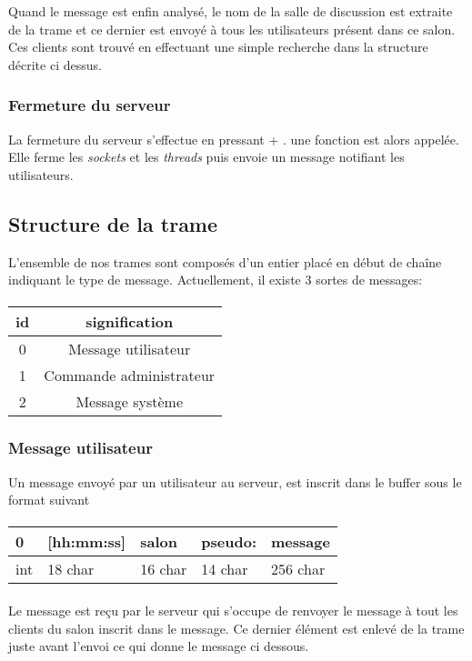 \documentclass[a4paper, 12pt]{article}
\newcommand{\Touche}[1]{\Ovalbox{#1}}
\begin{document}
Quand le message est enfin analysé, le nom de la salle de discussion est extraite de la trame et ce dernier est envoyé à tous les utilisateurs présent dans ce salon. Ces clients sont trouvé en effectuant une simple recherche dans la structure décrite ci dessus.

\subsubsection{Fermeture du serveur}
La fermeture du serveur s'effectue en pressant \Touche{Ctrl} + \Touche{C}. une fonction est alors appelée. Elle ferme les \emph{sockets} et les \emph{threads} puis envoie un message notifiant les utilisateurs.

\subsection{Structure de la trame}
L'ensemble de nos trames sont composés d'un entier placé en début de chaîne indiquant le type de message.
Actuellement, il existe 3 sortes de messages:
\paragraph{}
\begin{tabular}{|c|c|}
 \hline			
   id & signification \\
 \hline		
   0 & Message utilisateur \\
 \hline
   1 & Commande administrateur \\
 \hline
   2 & Message système \\
 \hline
 \end{tabular}
\subsubsection{Message utilisateur}
Un message envoyé par un utilisateur au serveur, est inscrit dans le buffer sous le format suivant
\paragraph{}
\begin{tabular}{|p{0.5cm}|p{2cm}|p{1.6cm}|p{1.5cm}|p{5cm}| }
 \hline			
  0 & [hh:mm:ss] & salon & pseudo: & message \\
 \hline		
  int & 18 char & 16 char & 14 char & 256 char \\
 \hline  
 \end{tabular}
 \paragraph{}
Le message est reçu par le serveur qui s'occupe de renvoyer le message à tout les clients du salon inscrit dans le message.
Ce dernier élément est enlevé de la trame juste avant l'envoi ce qui donne le message ci dessous.
\end{document}

